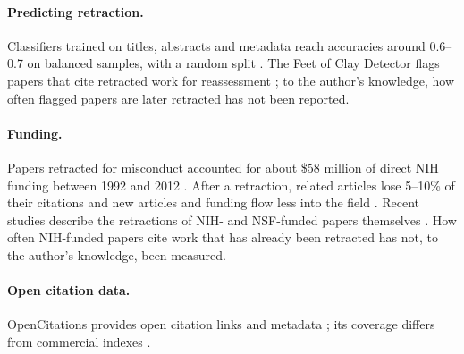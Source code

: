 \paragraph{Predicting retraction.} Classifiers trained on titles, abstracts and metadata reach accuracies around 0.6--0.7
on balanced samples, with a random split \citep{fletcher2025predicting}. The Feet of Clay Detector flags papers that
cite retracted work for reassessment \citep{cabanac2024chain}; to the author's knowledge, how often flagged papers are later
retracted has not been reported.

\paragraph{Funding.} Papers retracted for misconduct accounted for about \$58 million of direct NIH funding
between 1992 and 2012 \citep{stern2014costs}. After a retraction, related articles lose 5--10\% of their citations and
new articles and funding flow less into the field \citep{azoulay2015retractions}. Recent studies describe the
retractions of NIH- and NSF-funded papers themselves \citep{peterson2025nih,salisbury2026nih}. How often NIH-funded
papers cite work that has already been retracted has not, to the author's knowledge, been measured.

\paragraph{Open citation data.} OpenCitations provides open citation links and metadata
\citep{peroni2020opencitations,heibi2019coci,massari2024meta}; its coverage differs from commercial indexes
\citep{martinmartin2021coverage}.
